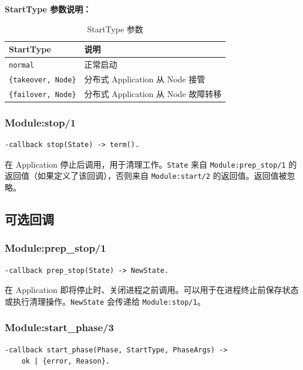 \documentclass[a4paper,11pt]{article}
\begin{document}
\textbf{StartType 参数说明：}

\begin{table}[H]
\centering
\begin{tabular}{@{}lp{9cm}@{}}
\toprule
\textbf{StartType} & \textbf{说明} \\
\midrule
\texttt{normal} & 正常启动 \\
\texttt{\{takeover, Node\}} & 分布式 Application 从 Node 接管 \\
\texttt{\{failover, Node\}} & 分布式 Application 从 Node 故障转移 \\
\bottomrule
\end{tabular}
\caption{StartType 参数}
\end{table}

\subsubsection{Module:stop/1}

\begin{lstlisting}[style=erlangstyle]
-callback stop(State) -> term().
\end{lstlisting}

在 Application 停止后调用，用于清理工作。\texttt{State} 来自 \texttt{Module:prep\_stop/1} 的返回值（如果定义了该回调），否则来自 \texttt{Module:start/2} 的返回值。返回值被忽略。

\subsection{可选回调}

\subsubsection{Module:prep\_stop/1}

\begin{lstlisting}[style=erlangstyle]
-callback prep_stop(State) -> NewState.
\end{lstlisting}

在 Application 即将停止时、关闭进程之前调用。可以用于在进程终止前保存状态或执行清理操作。\texttt{NewState} 会传递给 \texttt{Module:stop/1}。

\subsubsection{Module:start\_phase/3}

\begin{lstlisting}[style=erlangstyle]
-callback start_phase(Phase, StartType, PhaseArgs) ->
    ok | {error, Reason}.
\end{lstlisting}
\end{document}
